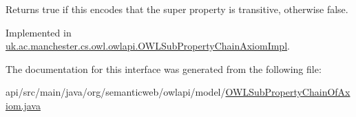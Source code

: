 \begin{DoxyReturn}{Returns}
{\ttfamily true} if this encodes that the super property is transitive, otherwise {\ttfamily false}. 
\end{DoxyReturn}


Implemented in \hyperlink{classuk_1_1ac_1_1manchester_1_1cs_1_1owl_1_1owlapi_1_1_o_w_l_sub_property_chain_axiom_impl_a8193ab16f95dad2fef549c44b644e02f}{uk.\-ac.\-manchester.\-cs.\-owl.\-owlapi.\-O\-W\-L\-Sub\-Property\-Chain\-Axiom\-Impl}.



The documentation for this interface was generated from the following file\-:\begin{DoxyCompactItemize}
\item 
api/src/main/java/org/semanticweb/owlapi/model/\hyperlink{_o_w_l_sub_property_chain_of_axiom_8java}{O\-W\-L\-Sub\-Property\-Chain\-Of\-Axiom.\-java}\end{DoxyCompactItemize}
